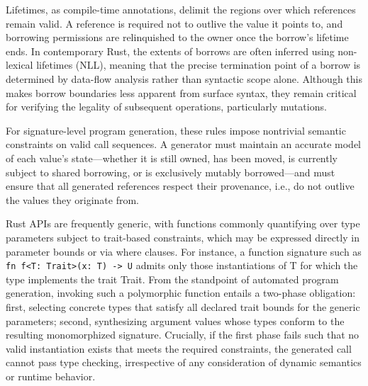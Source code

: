 \documentclass[runningheads]{llncs}
\begin{document}
Lifetimes, as compile-time annotations, delimit the regions over which references remain valid. A reference is required not to outlive the value it points to, and borrowing permissions are relinquished to the owner once the borrow’s lifetime ends. In contemporary Rust, the extents of borrows are often inferred using non-lexical lifetimes (NLL), meaning that the precise termination point of a borrow is determined by data-flow analysis rather than syntactic scope alone. Although this makes borrow boundaries less apparent from surface syntax, they remain critical for verifying the legality of subsequent operations, particularly mutations.

For signature-level program generation, these rules impose nontrivial semantic constraints on valid call sequences. A generator must maintain an accurate model of each value’s state—whether it is still owned, has been moved, is currently subject to shared borrowing, or is exclusively mutably borrowed—and must ensure that all generated references respect their provenance, i.e., do not outlive the values they originate from.

Rust APIs are frequently generic, with functions commonly quantifying over type parameters subject to trait-based constraints, which may be expressed directly in parameter bounds or via where clauses. For instance, a function signature such as \texttt{fn f<T: Trait>(x: T) -> U} admits only those instantiations of T for which the type implements the trait Trait. From the standpoint of automated program generation, invoking such a polymorphic function entails a two-phase obligation: first, selecting concrete types that satisfy all declared trait bounds for the generic parameters; second, synthesizing argument values whose types conform to the resulting monomorphized signature. Crucially, if the first phase fails such that no valid instantiation exists that meets the required constraints, the generated call cannot pass type checking, irrespective of any consideration of dynamic semantics or runtime behavior.
\end{document}
